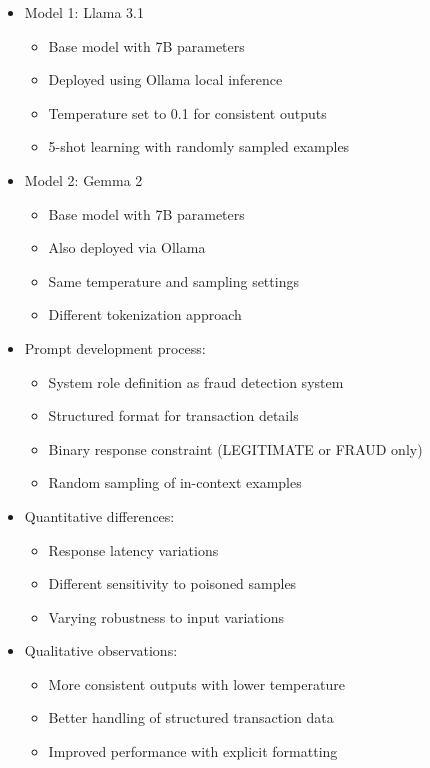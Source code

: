 \documentclass{article}
\begin{document}
\begin{itemize}
    \item Model 1: Llama 3.1
    \begin{itemize}
        \item Base model with 7B parameters
        \item Deployed using Ollama local inference
        \item Temperature set to 0.1 for consistent outputs
        \item 5-shot learning with randomly sampled examples
    \end{itemize}

    \item Model 2: Gemma 2
    \begin{itemize}
        \item Base model with 7B parameters
        \item Also deployed via Ollama
        \item Same temperature and sampling settings
        \item Different tokenization approach
    \end{itemize}

    \item Prompt development process:
    \begin{itemize}
        \item System role definition as fraud detection system
        \item Structured format for transaction details
        \item Binary response constraint (LEGITIMATE or FRAUD only)
        \item Random sampling of in-context examples
    \end{itemize}

    \item Quantitative differences:
    \begin{itemize}
        \item Response latency variations
        \item Different sensitivity to poisoned samples
        \item Varying robustness to input variations
    \end{itemize}

    \item Qualitative observations:
    \begin{itemize}
        \item More consistent outputs with lower temperature
        \item Better handling of structured transaction data
        \item Improved performance with explicit formatting
    \end{itemize}
\end{itemize}
\end{document}

